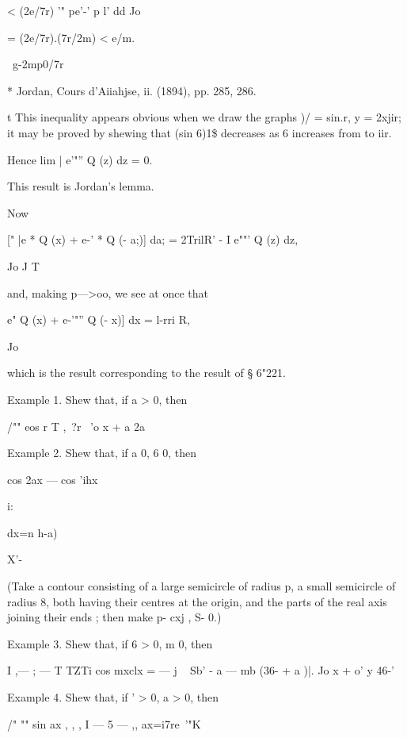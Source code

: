 < (2e/7r) '" pe'-' p l' dd Jo



= (2e/7r).(7r/2m) < e/m.



\ g-2mp0/7r



* Jordan, Cours d'Aiiahjse, ii. (1894), pp. 285, 286.

t This inequality appears obvious when we draw the graphs )/ = sin.r,
y = 2xjir; it may be proved by shewing that (sin 6)1\$ decreases as 6
increases from to iir.

%
%

Hence lim | e'"'' Q (z) dz = 0.



This result is Jordan's lemma.

Now

[" |e * Q (x) + e-' * Q (- a;)] da; = 2TrilR' - I e""' Q (z) dz,

Jo J T

and, making p—>oo, we see at once that

 e" Q (x) + e-'"'' Q (- x)] dx = l-rri R,

Jo

which is the result corresponding to the result of § 6"221.

Example 1. Shew that, if a > 0, then

/"" eos r T ,\ ?r \ 'o x + a 2a





Example 2. Shew that, if a 0, 6 0, then

cos 2ax — cos 'ihx



i:



dx=n h-a)



X'-

(Take a contour consisting of a large semicircle of radius p, a small
semicircle of radius 8, both having their centres at the origin, and
the parts of the real axis joining their ends ; then make p- cxj , S-
0.)

Example 3. Shew that, if 6 > 0, m 0, then

I ,— ; — T TZTi cos mxclx = — j ~ Sb' - a — mb (36- + a )|. Jo x + o'
y 46-'

Example 4. Shew that, if ' > 0, a > 0, then

/" "" sin ax , , , I — 5 — ,, ax=i7re~'"K

